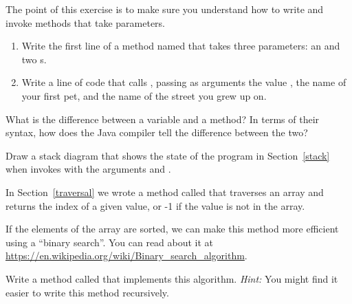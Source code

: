 \begin{exercise}  %

The point of this exercise is to make sure you understand how to write and invoke methods that take parameters.

\begin{enumerate}
\item Write the first line of a method named  that takes three parameters: an  and two s.

\item Write a line of code that calls , passing as arguments the value , the name of your first pet, and the name of the street you grew up on.
\end{enumerate}

\end{exercise}


\begin{exercise}

What is the difference between a variable and a method?
In terms of their syntax, how does the Java compiler tell the difference between the two?


\end{exercise}


\begin{exercise}

Draw a stack diagram that shows the state of the program in Section~\ref{stack} when  invokes  with the arguments  and .

\end{exercise}


\begin{exercise}

In Section~\ref{traversal} we wrote a method called  that traverses an array and returns the index of a given value, or -1 if the value is not in the array.

If the elements of the array are sorted, we can make this method more efficient using a ``binary search''.
You can read about it at \url{https://en.wikipedia.org/wiki/Binary_search_algorithm}.

Write a method called  that implements this algorithm.
{\it Hint:} You might find it easier to write this method recursively.

\end{exercise}


